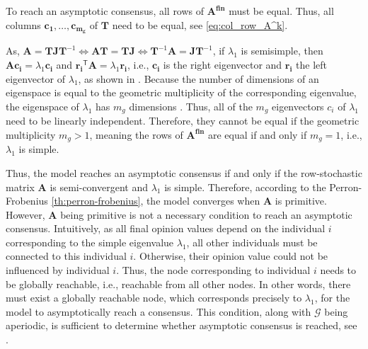 \documentclass[journal,compsoc,10pt]{IEEEtran}
\newcommand{\gG}{\mathcal{G}}
\newcommand{\T}{\mathsf{T}}            %
\renewcommand{\vec}[1]{\bm{#1}}        %
\newcommand{\mat}[1]{\bm{#1}}          %
\begin{document}

To reach an asymptotic consensus, all rows of $\mat{A^{fin}}$ must be equal. Thus, all columns $\vec{c_1}, \dots, \vec{c_{m_g}}$ of $\mat T$ need to be equal, see \cref{eq:col_row_A^k}.

As, $\mat A = \mat T\mat J\mat T^{-1} \iff \mat A\mat T = \mat T\mat J \iff \mat T^{-1}\mat A = \mat J\mat T^{-1}$, if $\lambda_1$ is semisimple, then $\mat A\vec{c_i} = \lambda_1\vec{c_i}$ and $\vec{r_i}^\T\mat A = \lambda_1\vec{r_i}$, i.e., $\vec{c_i}$ is the right eigenvector and $\vec{r_i}$ the left eigenvector of $\lambda_1$, as shown in \cite{Bullo_lecture}. Because the number of dimensions of an eigenspace is equal to the geometric multiplicity of the corresponding eigenvalue, the eigenspace of $\lambda_1$ has $m_g$ dimensions \cite{axler}.
Thus, all of the $m_g$ eigenvectors $c_i$ of $\lambda_1$ need to be linearly independent. Therefore, they cannot be equal if the geometric multiplicity $m_g>1$, meaning the rows of $\mat{A^{fin}}$ are equal if and only if $m_g = 1$, i.e., $\lambda_1$ is simple.

Thus, the model reaches an asymptotic consensus if and only if the row-stochastic matrix $\mat A$ is semi-convergent and $\lambda_1$ is simple. Therefore, according to the Perron-Frobenius \cref{th:perron-frobenius}, the model converges when $\mat A$ is primitive. However, $\mat A$ being primitive is not a necessary condition to reach an asymptotic consensus. Intuitively, as all final opinion values depend on the individual $i$ corresponding to the simple eigenvalue $\lambda_1$, all other individuals must be connected to this individual $i$. Otherwise, their opinion value could not be influenced by individual $i$. Thus, the node corresponding to individual $i$ needs to be globally reachable, i.e., reachable from all other nodes. In other words, there must exist a globally reachable node, which corresponds precisely to $\lambda_1$, for the model to asymptotically reach a consensus. This condition, along with $\gG$ being aperiodic, is sufficient to determine whether asymptotic consensus is reached, see \cite{Bullo_lecture}.
\end{document}
